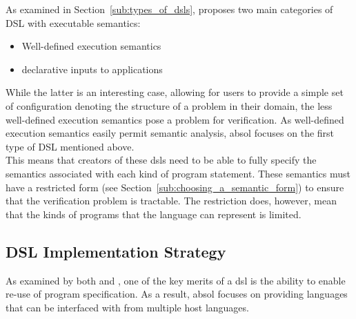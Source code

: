 As examined in Section~\ref{sub:types_of_dsls}, \citet{Mernik:2005:DDL:1118890.1118892} proposes two main categories of DSL with executable semantics:
\begin{itemize}
    \item Well-defined execution semantics
    \item \Gls{declarative} inputs to applications
\end{itemize}

While the latter is an interesting case, allowing for users to provide a simple set of configuration denoting the structure of a problem in their domain, the less well-defined execution semantics pose a problem for verification.
As well-defined execution semantics easily permit semantic analysis, \gls{absol} focuses on the first type of DSL mentioned above.\\

This means that creators of these \glspl{dsl} need to be able to fully specify the semantics associated with each kind of program statement. 
These semantics must have a restricted form (see Section~\ref{sub:choosing_a_semantic_form}) to ensure that the verification problem is tractable.  
The restriction does, however, mean that the kinds of programs that the language can represent is limited.


\subsection{DSL Implementation Strategy} %
\label{sub:dsl_implementation_strategy}
As examined by both \citet{Mernik:2005:DDL:1118890.1118892} and \citet{van2000domain}, one of the key merits of a \gls{dsl} is the ability to enable re-use of program specification. 
As a result, \gls{absol} focuses on providing languages that can be interfaced with from multiple host languages. \\

